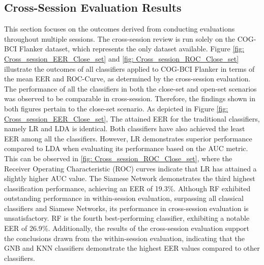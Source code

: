
\subsection{Cross-Session Evaluation Results}
\label{sec:Evaluation:Results:Cross-Session Evaluation results}
This section focuses on the outcomes derived from conducting evaluations throughout multiple sessions. The cross-session review is run solely on the COG-BCI Flanker dataset, which represents the only dataset available. Figure \ref{fig: Cross_session_EER_Close_set} and \ref{fig: Cross_session_ROC_Close_set} illustrate the outcomes of all classifiers applied to COG-BCI Flanker in terms of the mean EER and ROC-Curve, as determined by the cross-session evaluation. The performance of all the classifiers in both the close-set and open-set scenarios was observed to be comparable in cross-session. Therefore, the findings shown in both figures pertain to the close-set scenario. As depicted in Figure \ref{fig: Cross_session_EER_Close_set}, %
The attained EER for the traditional classifiers, namely LR and LDA is identical. Both classifiers have also achieved the least EER among all the classifiers. However, LR demonstrates superior performance compared to LDA when evaluating its performance based on the AUC metric. This can be observed in \ref{fig: Cross_session_ROC_Close_set}, where the Receiver Operating Characteristic (ROC) curves indicate that LR has attained a slightly higher AUC value. The Siamese Network demonstrates the third highest classification performance, achieving an EER of 19.3$\%$. Although RF exhibited outstanding performance in within-session evaluation, surpassing all classical classifiers and Siamese Networks, its performance in cross-session evaluation is unsatisfactory. RF is the fourth best-performing classifier, exhibiting a notable EER of 26.9$\%$. Additionally, the results of the cross-session evaluation support the conclusions drawn from the within-session evaluation, indicating that the GNB and KNN classifiers demonstrate the highest EER values compared to other classifiers.  
